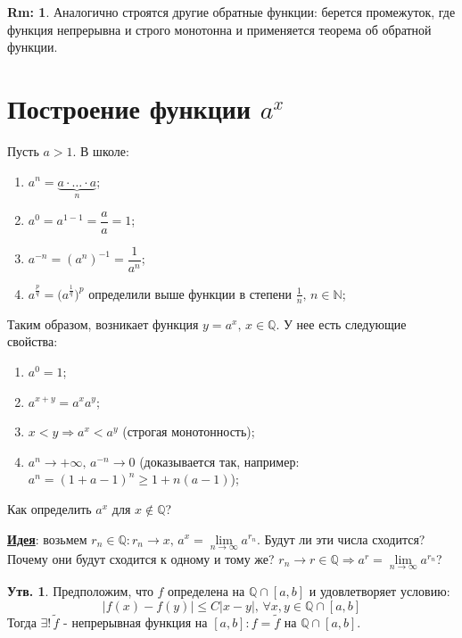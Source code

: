 \documentclass[12pt]{article}
\newcommand{\MQ}{\mathbb{Q}}
\theoremstyle{definition}
\newtheorem{rem}{Rm:}
\newtheorem{prop}{Утв.}
\begin{document}
\begin{rem}
	Аналогично строятся другие обратные функции: берется промежуток, где функция непрерывна и строго монотонна и применяется теорема об обратной функции.
\end{rem}
\newpage

\section*{Построение функции $a^x$}
Пусть $a > 1$. В школе: 
\begin{enumerate}
	\item $a^n = \underbrace{a\cdot \dotsc \cdot a}_{n}$;
	\item $a^0 = a^{1-1} = \dfrac{a}{a} = 1$;
	\item $a^{-n} = (a^n)^{-1} = \dfrac{1}{a^{n}}$;
	\item $a^{\frac{p}{q}} = \Big( a^{\frac{1}{q}} \Big)^p$ определили выше функции в степени $\frac{1}{n}, \, n \in \mathbb{N}$;
\end{enumerate}

Таким образом, возникает функция $y = a^x, \, x \in \MQ$. У нее есть следующие свойства:
\begin{enumerate}
	\item $a^0 = 1$;
	\item $a^{x+ y} = a^xa^y$;
	\item $x < y \Rightarrow a^x < a^y$ (строгая монотонность);
	\item $a^n \to +\infty, \, a^{-n} \to 0$ (доказывается так, например: $a^n = (1 + a -1)^n \geq 1 + n(a-1)$);
\end{enumerate}

Как определить $a^x$ для $x \notin \MQ$? 

\uline{\textbf{Идея}}: возьмем $r_n \in \MQ \colon r_n \to x, \, a^x = \lim\limits_{n \to \infty} a^{r_n}$. Будут ли эти числа сходится? Почему они будут сходится к одному и тому же? $r_n \to r \in \MQ \Rightarrow a^r = \lim\limits_{n \to \infty} a^{r_n}$?

\begin{prop}
	Предположим, что $f$ определена на $\MQ \cap [a,b]$ и удовлетворяет условию: 
	$$|f(x) - f(y)| \leq C |x-y|, \, \forall x,y \in \MQ \cap [a,b]$$ 
	Тогда $\exists! \, \tilde{f}$ - непрерывная функция на $[a,b] \colon f = \tilde{f}$ на $\MQ \cap [a,b]$.
\end{prop}
\end{document}
